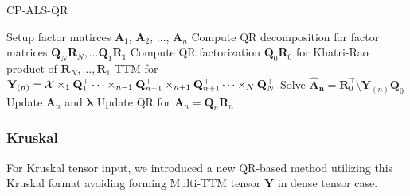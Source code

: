 \documentclass{article}
\newcommand{\mat}[1]{\mathbf{#1}}
\newcommand{\M}[2][]{\bm{#1{\mathbf{\MakeUppercase{#2}}}}} 		%
\newcommand{\T}[2][]{#1{\mathbf{\cal{#2}}}} 						%
\begin{document}
\begin{algorithm}
  \caption{CP-ALS-QR}
  \label{alg:cp-als-qr}
  \begin{algorithmic}[1]
    \Function{$[\bm{\lambda},\M{A}_{n}]=$ CP-ALS}{$\T{X},R$}
      \State Setup factor matirces  $\mat{A}_1$, $\mat{A}_2$, $\dots$, $\mat{A}_n$
      \State Compute QR decomposition for factor matrices $\mat{Q}_N\mat{R}_N, \dots \mat{Q}_1\mat{R}_1$
      \State Compute QR factorization $\mat{Q}_0\mat{R}_0$ for Khatri-Rao product of $\mat{R}_N, \dots, \mat{R}_1$
      \State TTM for $\mat{Y}_{(n)} =  \T{X} \times_1 \mat{Q}_1^\top \dots \times_{n-1} \mat{Q}_{n-1}^\top \times_{n+1} \mat{Q}_{n+1}^\top \dots \times_N \mat{Q}_N^\top$
      \State Solve $\mat{\hat{A}_n} = \mat{R}_0^\top \text{\textbackslash} \mat{Y}_{(n)} \mat{Q}_0$
      \State Update $\mat{A}_n$ and $\bm{\lambda}$
      \State Update QR for $\mat{A}_n = \mat{Q}_n\mat{R}_n$      
      \EndFor
      \EndWhile
    \EndFunction
  \end{algorithmic}
\end{algorithm}



\subsubsection{Kruskal}
For Kruskal tensor input, we introduced a new QR-based method utilizing this Kruskal format avoiding
forming Multi-TTM tensor $\mat{Y}$ in dense tensor case.
\end{document}
